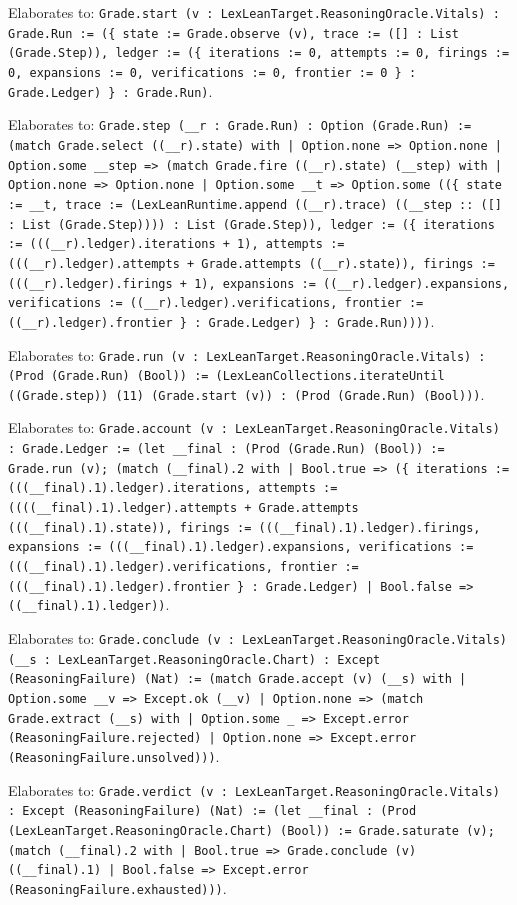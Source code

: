 \documentclass[11pt]{article}
\begin{document}
\noindent Elaborates to: \texttt{Grade.start (v : LexLeanTarget.ReasoningOracle.Vitals) : Grade.Run := (\{ state := Grade.observe (v), trace := ([] : List (Grade.Step)), ledger := (\{ iterations := 0, attempts := 0, firings := 0, expansions := 0, verifications := 0, frontier := 0 \} : Grade.Ledger) \} : Grade.Run)}.\par
\noindent Elaborates to: \texttt{Grade.step (\_\_r : Grade.Run) : Option (Grade.Run) := (match Grade.select ((\_\_r).state) with | Option.none => Option.none | Option.some \_\_step => (match Grade.fire ((\_\_r).state) (\_\_step) with | Option.none => Option.none | Option.some \_\_t => Option.some ((\{ state := \_\_t, trace := (LexLeanRuntime.append ((\_\_r).trace) ((\_\_step :: ([] : List (Grade.Step)))) : List (Grade.Step)), ledger := (\{ iterations := (((\_\_r).ledger).iterations + 1), attempts := (((\_\_r).ledger).attempts + Grade.attempts ((\_\_r).state)), firings := (((\_\_r).ledger).firings + 1), expansions := ((\_\_r).ledger).expansions, verifications := ((\_\_r).ledger).verifications, frontier := ((\_\_r).ledger).frontier \} : Grade.Ledger) \} : Grade.Run))))}.\par
\noindent Elaborates to: \texttt{Grade.run (v : LexLeanTarget.ReasoningOracle.Vitals) : (Prod (Grade.Run) (Bool)) := (LexLeanCollections.iterateUntil ((Grade.step)) (11) (Grade.start (v)) : (Prod (Grade.Run) (Bool)))}.\par
\noindent Elaborates to: \texttt{Grade.account (v : LexLeanTarget.ReasoningOracle.Vitals) : Grade.Ledger := (let \_\_final : (Prod (Grade.Run) (Bool)) := Grade.run (v); (match (\_\_final).2 with | Bool.true => (\{ iterations := (((\_\_final).1).ledger).iterations, attempts := ((((\_\_final).1).ledger).attempts + Grade.attempts (((\_\_final).1).state)), firings := (((\_\_final).1).ledger).firings, expansions := (((\_\_final).1).ledger).expansions, verifications := (((\_\_final).1).ledger).verifications, frontier := (((\_\_final).1).ledger).frontier \} : Grade.Ledger) | Bool.false => ((\_\_final).1).ledger))}.\par
\noindent Elaborates to: \texttt{Grade.conclude (v : LexLeanTarget.ReasoningOracle.Vitals) (\_\_s : LexLeanTarget.ReasoningOracle.Chart) : Except (ReasoningFailure) (Nat) := (match Grade.accept (v) (\_\_s) with | Option.some \_\_v => Except.ok (\_\_v) | Option.none => (match Grade.extract (\_\_s) with | Option.some \_ => Except.error (ReasoningFailure.rejected) | Option.none => Except.error (ReasoningFailure.unsolved)))}.\par
\noindent Elaborates to: \texttt{Grade.verdict (v : LexLeanTarget.ReasoningOracle.Vitals) : Except (ReasoningFailure) (Nat) := (let \_\_final : (Prod (LexLeanTarget.ReasoningOracle.Chart) (Bool)) := Grade.saturate (v); (match (\_\_final).2 with | Bool.true => Grade.conclude (v) ((\_\_final).1) | Bool.false => Except.error (ReasoningFailure.exhausted)))}.\par
\end{document}
